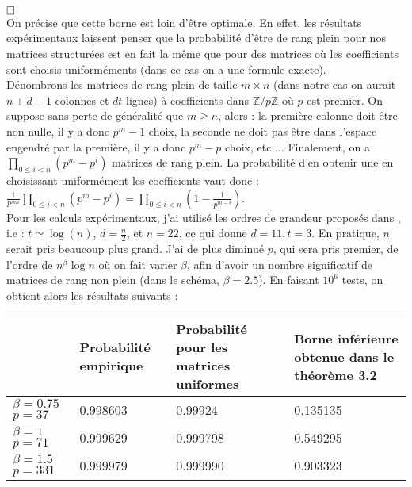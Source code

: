 \documentclass[11pt,a4paper]{article}
\begin{document}
$\hfill \square$ 
\\

On précise que cette borne est loin d'être optimale. En effet, les résultats expérimentaux laissent penser que la probabilité d'être de rang plein pour nos matrices structurées est en fait la même que pour des matrices où les coefficients sont choisis uniforméments (dans ce cas on a une formule exacte). \\

Dénombrons les matrices de rang plein de taille $m \times n$ (dans notre cas on aurait $n+d-1$ colonnes et $dt$ lignes) à coefficients dans $\mathbb{Z}/p\mathbb{Z}$ où $p$ est premier. On suppose sans perte de généralité que $m\geq n$, alors : la première colonne doit être non nulle, il y a donc $p^m-1$ choix, la seconde ne doit pas être dans l'espace engendré par la première, il y a donc $p^m -p$ choix, etc $\dots$ Finalement, on a $\displaystyle \prod_{0\leq i < n}(p^m - p^i)$ matrices de rang plein. La probabilité d'en obtenir une en choisissant uniformément les coefficients vaut donc :  $ \displaystyle \frac{1}{p^{mn}} \prod_{0\leq i < n}(p^m - p^i) = \displaystyle \prod_{0\leq i < n}(1 - \frac{1}{p^{m-i}})$. \\

Pour les calculs expérimentaux, j'ai utilisé les ordres de grandeur proposés dans \cite{mplwe}, i.e : $t\simeq \log(n)$, $d=\frac{n}{2}$, et $n=22$, ce qui donne  $d=11, t=3$. En pratique, $n$ serait pris beaucoup plus grand. J'ai de plus diminué $p$, qui sera pris premier, de l'ordre de $n^\beta\log{n}$ où on fait varier $\beta$, afin d'avoir un nombre significatif de matrices de rang non plein (dans le schéma, $\beta=2.5$).  En faisant $10^6$ tests, on obtient alors les résultats suivants : \\

{
\centering
\begin{tabular}{|C{2cm}|C{3cm}|C{3cm}|C{3cm}|}
	\hline 
	& Probabilité empirique & Probabilité pour les matrices uniformes & Borne inférieure obtenue dans le théorème 3.2 \\	  
	\hline
	$\beta=0.75$ $p=37$  & 0.998603 & 0.99924 & 0.135135  \\ 
	\hline
	$\beta=1$ $p=71$  & 0.999629 & 0.999798 & 0.549295  \\
	\hline
	$\beta=1.5$ $p=331$  & 0.999979 & 0.999990 & 0.903323 \\
	\hline
\end{tabular}\par
}
~\\
\end{document}
